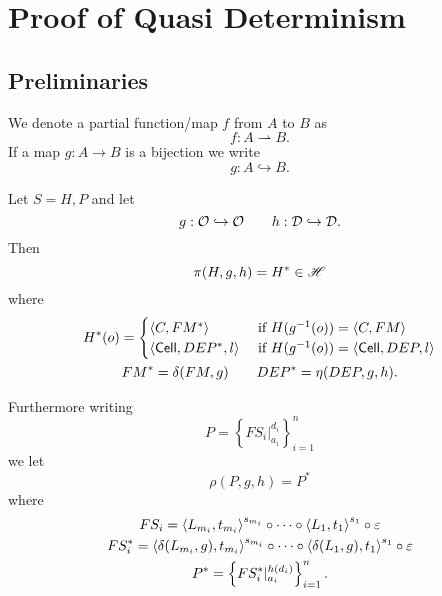 \chapter{Proof of Quasi Determinism}

\section{Preliminaries}
\label{sec:preliminaries}

\begin{notation}
  We denote a partial function/map $f$ from $A$ to $B$ as
  \begin{equation*}
    f: A \rightharpoonup B.
  \end{equation*}
  If a map $g: A \to B$ is a bijection we write
  \begin{equation*}
    g: A \hookrightarrow B.
  \end{equation*}
\end{notation}

\begin{definition} \label{def:pirho}
  Let $S = H, P$ and let 
  \begin{equation*}
    g: \mathcal{O} \hookrightarrow \mathcal{O} \quad\quad h: \mathcal{D} \hookrightarrow \mathcal{D} .
  \end{equation*}
  Then 
  \begin{equation}
    \pi(H, g, h) = H^* \in \mathscr{H}
  \end{equation}
  where
  \begin{equation}
    \begin{gathered}
      H^*(o) =
      \begin{cases}
        \mbox{$\langle C, FM^* \rangle$}   & \text{ if } H(g^{-1}(o)) = \mbox{$\langle C, FM \rangle$} \\
        \mbox{$\langle \mbox{$\mathsf{Cell}$}{}, DEP^*, l \rangle$} & \text{ if } H(g^{-1}(o)) = \mbox{$\langle \mbox{$\mathsf{Cell}$}{}, DEP, l \rangle$}
      \end{cases} \\
      FM^* = \delta(FM, g) \quad\quad DEP^* = \eta(DEP, g, h).
    \end{gathered}
  \end{equation}

  Furthermore writing
  \begin{equation}
    P = \left\{ FS_i|_{a_i}^{d_i} \right\}_{i = 1}^n
  \end{equation}
  we let
  \begin{equation*}
    \rho(P, g, h) = P^*
  \end{equation*}
  where
  \begin{equation*}
    \begin{gathered}
      FS_i = \mbox{$\langle L_{m_i}, t_{m_i} \rangle$}^{s_{m_i}} \circ \dots \circ \mbox{$\langle L_1,
      t_1 \rangle$}^{s_1} \circ \varepsilon \\
      FS_i^* = \mbox{$\langle \delta(L_{m_i}, g), t_{m_i} \rangle$}^{s_{m_i}} \circ \dots \circ
      \mbox{$\langle \delta(L_1,g), t_1 \rangle$}^{s_1} \circ \varepsilon \\
      P^* = \left\{ FS_i^*|_{a_i}^{h(d_i)} \right\}_{i = 1}^n.
    \end{gathered}
  \end{equation*}
\end{definition}

